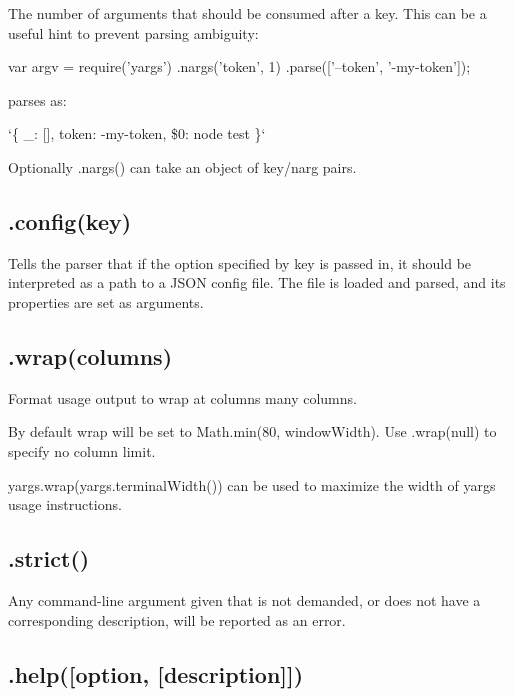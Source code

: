 The number of arguments that should be consumed after a key. This can be a useful hint to prevent parsing ambiguity\+:


\begin{DoxyCode}
var argv = require('yargs')
  .nargs('token', 1)
  .parse(['--token', '-my-token']);
\end{DoxyCode}


parses as\+:

`\{ \+\_\+\+: \mbox{[}\mbox{]}, token\+: \textquotesingle{}-\/my-\/token\textquotesingle{}, \textquotesingle{}\$0\textquotesingle{}\+: \textquotesingle{}node test\textquotesingle{} \}`

Optionally {\ttfamily .nargs()} can take an object of {\ttfamily key}/{\ttfamily narg} pairs.

\subsection*{.config(key) }

Tells the parser that if the option specified by {\ttfamily key} is passed in, it should be interpreted as a path to a J\+S\+ON config file. The file is loaded and parsed, and its properties are set as arguments.

\subsection*{.wrap(columns) }

Format usage output to wrap at {\ttfamily columns} many columns.

By default wrap will be set to {\ttfamily Math.\+min(80, window\+Width)}. Use {\ttfamily .wrap(null)} to specify no column limit.

{\ttfamily yargs.\+wrap(yargs.\+terminal\+Width())} can be used to maximize the width of yargs\textquotesingle{} usage instructions.

\subsection*{.strict() }

Any command-\/line argument given that is not demanded, or does not have a corresponding description, will be reported as an error.

\subsection*{.help(\mbox{[}option, \mbox{[}description\mbox{]}\mbox{]}) }

